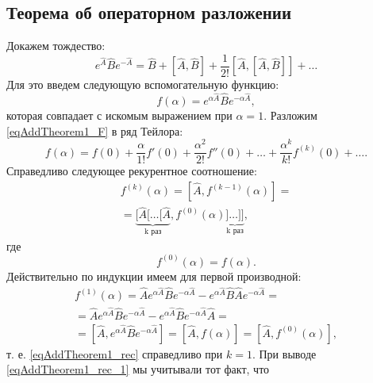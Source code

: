 \subsection{Теорема об операторном разложении}
\label{AddTheorem1}

Докажем тождество:
\begin{equation}
e^{\hat{A}}\hat{B}e^{-\hat{A}} = 
\hat{B} + \left[\hat{A},\hat{B}\right] + 
\frac{1}{2!} \left[\hat{A},\left[\hat{A},\hat{B}\right]\right] + \dots
\label{eqAddTheorem1_Main}
\end{equation}
Для это введем следующую вспомогательную функцию:
\begin{equation}
f\left(\alpha\right) = 
e^{\alpha\hat{A}}\hat{B}e^{-\alpha\hat{A}},
\label{eqAddTheorem1_F}
\end{equation}
которая совпадает с искомым выражением при $\alpha = 1$. Разложим
\eqref{eqAddTheorem1_F} в ряд Тейлора:
\begin{equation}
f\left(\alpha\right) = 
f\left(0\right) + \frac{\alpha}{1!}f'\left(0\right) +
\frac{\alpha^2}{2!}f''\left(0\right) + 
\dots +
\frac{\alpha^k}{k!}f^{(k)}\left(0\right) + \dots.
\label{eqAddTheorem1_T}
\end{equation}
Справедливо следующее рекурентное соотношение:
\begin{eqnarray}
f^{(k)}\left(\alpha\right) = \left[\hat{A},
  f^{(k-1)}\left(\alpha\right)\right] = 
\nonumber \\
=
\underbrace{
[\hat{A}[\dots[\hat{A}}_{\mbox{k
  раз}},
f^{(0)}\left(\alpha\right)
\underbrace{]\dots]]}_{\mbox{k
  раз}},
\label{eqAddTheorem1_rec}
\end{eqnarray}
где 
\[
f^{(0)}\left(\alpha\right) = f\left(\alpha\right).
\]
Действительно по индукции имеем для первой производной:
\begin{eqnarray}
f^{(1)}\left(\alpha\right) = \hat{A}
  e^{\alpha\hat{A}}\hat{B}e^{-\alpha\hat{A}} -
  e^{\alpha\hat{A}}\hat{B}\hat{A}e^{-\alpha\hat{A}} = 
\nonumber \\
= \hat{A}
  e^{\alpha\hat{A}}\hat{B}e^{-\alpha\hat{A}} -
  e^{\alpha\hat{A}}\hat{B}e^{-\alpha\hat{A}}\hat{A} = 
\nonumber \\
=
\left[\hat{A}, e^{\alpha\hat{A}}\hat{B}e^{-\alpha\hat{A}}\right] = 
\left[\hat{A}, f\left(\alpha\right)\right] = 
\left[\hat{A}, f^{(0)}\left(\alpha\right)\right],
\label{eqAddTheorem1_rec_1}
\end{eqnarray}
т. е. \eqref{eqAddTheorem1_rec} справедливо при $k = 1$. При выводе
\eqref{eqAddTheorem1_rec_1} мы учитывали тот факт, что 
